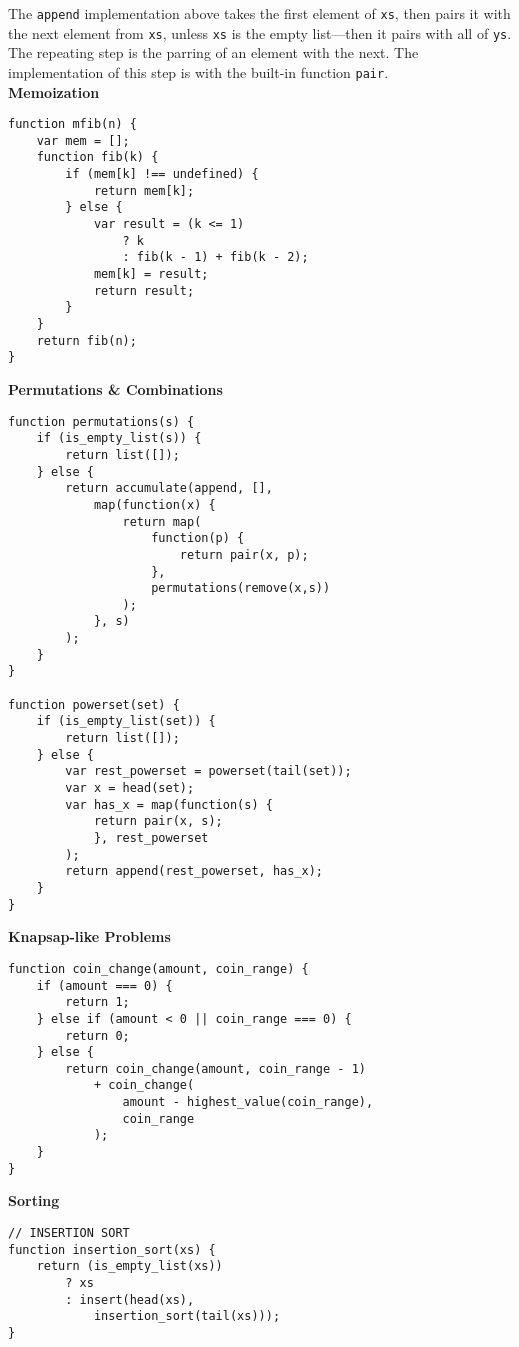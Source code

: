 \documentclass[a4paper]{article} \usepackage[backend=biber, style=numeric, sorting=none]{biblatex}
\begin{document}
\begin{multicols*}{4}
The \texttt{append} implementation above takes the first element of \texttt{xs}, then pairs it with the next element from \texttt{xs}, unless \texttt{xs} is the empty list---then it pairs with all of \texttt{ys}. The repeating step is the parring of an element with the next. The implementation of this step is with the built-in function \texttt{pair}.\\

{\small\textbf{Memoization}}
\begin{verbatim}
function mfib(n) {
    var mem = [];
    function fib(k) {
        if (mem[k] !== undefined) {
            return mem[k];
        } else {
            var result = (k <= 1)
                ? k
                : fib(k - 1) + fib(k - 2);
            mem[k] = result;
            return result;
        }
    }
    return fib(n);
}
\end{verbatim}

{\small\textbf{Permutations \& Combinations}}
\begin{verbatim}
function permutations(s) {
    if (is_empty_list(s)) {
        return list([]);
    } else {
        return accumulate(append, [],
            map(function(x) { 
                return map(
                    function(p) {
                        return pair(x, p);
                    }, 
                    permutations(remove(x,s))
                );
            }, s)
        );
    }
}

function powerset(set) {
    if (is_empty_list(set)) {
        return list([]);
    } else {
        var rest_powerset = powerset(tail(set));
        var x = head(set);
        var has_x = map(function(s) {
            return pair(x, s);
            }, rest_powerset
        );
        return append(rest_powerset, has_x);
    }
}
\end{verbatim}

{\small\textbf{Knapsap-like Problems}}

\begin{verbatim}
function coin_change(amount, coin_range) {
    if (amount === 0) {
        return 1;
    } else if (amount < 0 || coin_range === 0) {
        return 0;
    } else {
        return coin_change(amount, coin_range - 1)
            + coin_change(
                amount - highest_value(coin_range),
                coin_range
            );
    }
}
\end{verbatim}

{\small\textbf{Sorting}}
\begin{verbatim}
// INSERTION SORT
function insertion_sort(xs) {
    return (is_empty_list(xs))
        ? xs
        : insert(head(xs),
            insertion_sort(tail(xs)));
}


\end{verbatim}
\end{multicols*}
\end{document}
